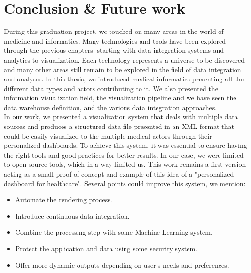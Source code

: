 \chapter{Conclusion \& Future work}
During this graduation project, we touched on many areas in the world of medicine and informatics. Many technologies and tools have been explored through the previous chapters, starting with data integration systems and analytics to visualization. Each technology represents a universe to be discovered and many other areas still remain to be explored in the field of data integration and analyses.
\bigbreak
In this thesis, we introduced medical informatics presenting all the different data types and actors contributing to it. We also presented the information visualization field, the visualization pipeline and we have seen the data warehouse definition, and the various data integration approaches.\\
In our work, we presented a visualization system that deals with multiple data sources and produces a structured data file presented in an XML format that could be easily visualized to the multiple medical actors through their personalized dashboards. To achieve this system, it was essential to ensure having the right tools and good practices for better results. 
In our case, we were limited to open source tools, which in a way limited us.
\bigbreak
This work remains a first version acting as a small proof of concept and example of this idea of a "personalized dashboard for healthcare". Several points could improve this system, we mention:
\begin{itemize}
\renewcommand{\labelitemi}{$\bullet$}
\item Automate the rendering process.
\item Introduce continuous data integration.
\item Combine the processing step with some Machine Learning system.
\item Protect the application and data using some security system.
\item Offer more dynamic outputs depending on user's needs and preferences.
\end{itemize}

